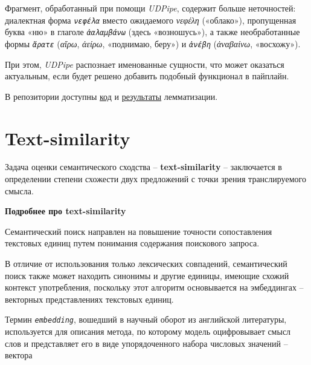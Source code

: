\documentclass[
  letterpaper,
]{book}
\begin{document}
Фрагмент, обработанный при помощи \emph{UDPipe}, содержит больше
неточностей: диалектная форма \emph{\texttt{νεφέλα}} вместо ожидаемого
\emph{νεφέλη} («облако»), пропущенная буква «ню» в глаголе
\emph{\texttt{ἀαλαμβάνω}} (здесь «возношусь»), а также необработанные
формы \emph{\texttt{ἄρατε}} (\emph{αἴρω}, \emph{ἀείρω}, «поднимаю,
беру») и \emph{\texttt{ἀνέβη}} (\emph{ἀναβαίνω}, «восхожу»).

При этом, \emph{UDPipe} распознает именованные сущности, что может
оказаться актуальным, если будет решено добавить подобный функционал в
пайплайн.

В репозитории доступны
\href{https://github.com/Drozhzhinastya/GSPC/tree/main/scripts/lemmatization}{код}
и
\href{https://github.com/Drozhzhinastya/GSPC/tree/main/lemmatization/greek}{результаты}
лемматизации.


\hypertarget{sec-about_txt_similarity}{%
\chapter{Text-similarity}\label{sec-about_txt_similarity}}

Задача оценки семантического сходства -- \textbf{text-similarity} --
заключается в определении степени схожести двух предложений с точки
зрения транслируемого смысла.

\begin{tcolorbox}[enhanced jigsaw, rightrule=.15mm, breakable, colframe=quarto-callout-note-color-frame, colback=white, leftrule=.75mm, left=2mm, arc=.35mm, opacityback=0, toprule=.15mm, bottomrule=.15mm]

\textbf{Подробнее про text-similarity}\vspace{2mm}

Семантический поиск направлен на повышение точности сопоставления
текстовых единиц путем понимания содержания поискового запроса.

В отличие от использования только лексических совпадений, семантический
поиск также может находить синонимы и другие единицы, имеющие схожий
контекст употребления, поскольку этот алгоритм основывается на
эмбеддингах -- векторных представлениях текстовых единиц.

Термин \emph{\texttt{embedding}}, вошедший в научный оборот из
английской литературы, используется для описания метода, по которому
модель оцифровывает смысл слов и представляет его в виде упорядоченного
набора числовых значений -- вектора

\end{tcolorbox}
\end{document}
